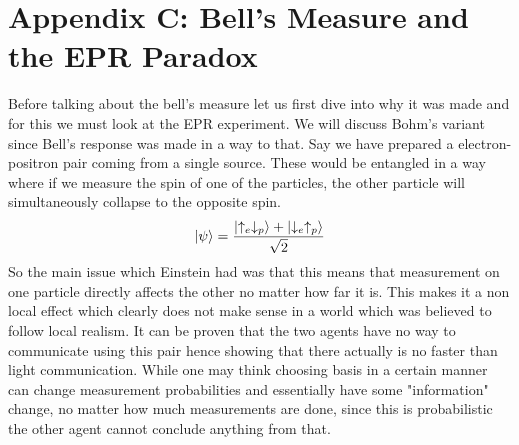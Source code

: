 \section*{Appendix C: Bell's Measure and the EPR Paradox}
\label{appC}

Before talking about the bell's measure let us first dive into why it was made and for this we must look at the EPR experiment\cite{EPR}. We will discuss Bohm's variant since Bell's response was made in a way to that. Say we have prepared a electron-positron pair coming from a single source. These would be entangled in a way where if we measure the spin of one of the particles, the other particle will simultaneously collapse to the opposite spin.
$$\left\vert \psi\right\rangle = \frac{\displaystyle \left\vert \uparrow_e\downarrow_p\right\rangle + \left\vert \downarrow_e\uparrow_p\right\rangle}{\displaystyle \sqrt{2}}$$
So the main issue which Einstein had was that this means that measurement on one particle directly affects the other no matter how far it is. This makes it a non local effect which clearly does not make sense in a world which was believed to follow local realism. It can be proven that the two agents have no way to communicate using this pair hence showing that there actually is no faster than light communication. While one may think choosing basis in a certain manner can change measurement probabilities and essentially have some "information" change, no matter how much measurements are done, since this is probabilistic the other agent cannot conclude anything from that.   

